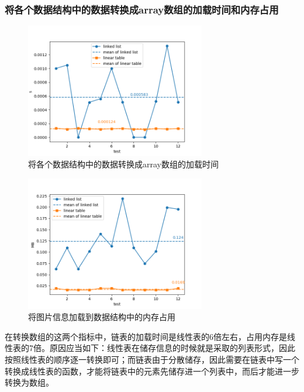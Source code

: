 \subsubsection{将各个数据结构中的数据转换成array数组的加载时间和内存占用}
\begin{figure}[H]
	\centering
	\includegraphics[width=0.7\textwidth]{time3}  %
	\caption{将各个数据结构中的数据转换成array数组的加载时间}
	\label{fig:your_label}
\end{figure}
\begin{figure}[H]
	\centering
	\includegraphics[width=0.7\textwidth]{memory3}  %
	\caption{将图片信息加载到数据结构中的内存占用}
	\label{fig:your_label}
\end{figure}
在转换数组的这两个指标中，链表的加载时间是线性表的6倍左右，占用内存是线性表的7倍。原因应当如下：线性表在储存信息的时候就是采取的列表形式，因此按照线性表的顺序逐一转换即可；而链表由于分散储存，因此需要在链表中写一个转换成线性表的函数，才能将链表中的元素先储存进一个列表中，而后才能进一步转换为数组。


